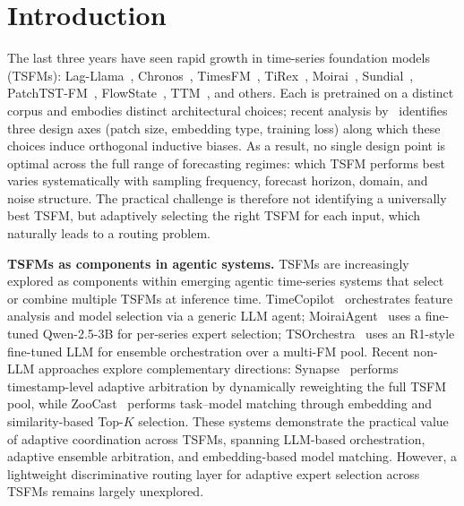 \documentclass{article}
\theoremstyle{plain}
\theoremstyle{definition}
\theoremstyle{remark}
\begin{document}
\section{Introduction}
\label{sec:intro}

The last three years have seen rapid growth in time-series foundation models (TSFMs): Lag-Llama~\citep{rasul2024lagllama}, Chronos~\citep{ansari2024chronos, ansari2025chronos2}, TimesFM~\citep{das2024timesfm}, TiRex~\citep{auer2025tirex}, Moirai~\citep{woo2024moirai, liu2024moiraimoe, liu2025moirai2}, Sundial~\citep{liu2025sundial}, PatchTST-FM~\citep{wen2026patchtstfm}, FlowState~\citep{graf2025flowstate}, TTM~\citep{ekambaram2024ttm}, and others. Each is pretrained on a distinct corpus and embodies distinct architectural choices; recent analysis by~\citet{yu2025biases} identifies three design axes (patch size, embedding type, training loss) along which these choices induce orthogonal inductive biases. As a result, no single design point is optimal across the full range of forecasting regimes: which TSFM performs best varies systematically with sampling frequency, forecast horizon, domain, and noise structure. The practical challenge is therefore not identifying a universally best TSFM, but adaptively selecting the right TSFM for each input, which naturally leads to a routing problem.

\textbf{TSFMs as components in agentic systems.} TSFMs are increasingly explored as components within emerging agentic time-series systems that select or combine multiple TSFMs at inference time. TimeCopilot~\citep{garza2025timecopilot} orchestrates feature analysis and model selection via a generic LLM agent; MoiraiAgent~\citep{moiraiagent} uses a fine-tuned Qwen-2.5-3B for per-series expert selection; TSOrchestra~\citep{tsorchestra} uses an R1-style fine-tuned LLM for ensemble orchestration over a multi-FM pool. Recent non-LLM approaches explore complementary directions: Synapse~\citep{synapse} performs timestamp-level adaptive arbitration by dynamically reweighting the full TSFM pool, while ZooCast~\citep{zoocast} performs task--model matching through embedding and similarity-based Top-$K$ selection. These systems demonstrate the practical value of adaptive coordination across TSFMs, spanning LLM-based orchestration, adaptive ensemble arbitration, and embedding-based model matching. However, a lightweight discriminative routing layer for adaptive expert selection across TSFMs remains largely unexplored.
\end{document}
